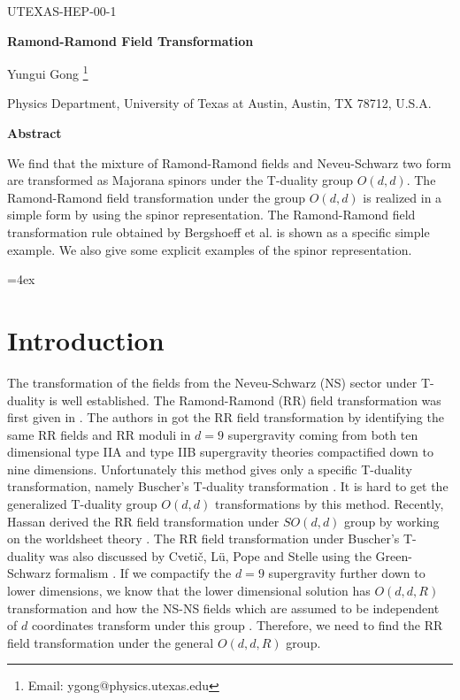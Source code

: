 \documentclass[a4paper,12pt]{article}
\begin{document}
\vspace *{2cm} 
\begin{flushright}
UTEXAS-HEP-00-1
\end{flushright}

\begin{center}
{\Large \bf Ramond-Ramond Field Transformation}

\bigskip

Yungui Gong \footnote{Email: ygong@physics.utexas.edu} 

Physics Department, University of Texas at Austin, Austin, TX 78712, U.S.A.
 
\bigskip
 
\vskip 0.8in
{\Large\bf Abstract}
\end{center}
We find that the mixture of Ramond-Ramond
fields and Neveu-Schwarz two form are transformed
as Majorana spinors under the T-duality group $O(d,d)$.
The Ramond-Ramond field transformation under
the group $O(d,d)$ is realized in a simple
form by using the spinor representation. The 
Ramond-Ramond field transformation rule obtained
by Bergshoeff et al. is shown as a specific simple example.
We also give some explicit examples of the spinor
representation.



\vskip 6cm

\pagebreak

\parindent=4ex 

\section{Introduction}

The transformation of the fields from the Neveu-Schwarz (NS) sector
under T-duality is well established. The Ramond-Ramond (RR) 
field transformation was first given in \cite{bergshoeff95}.
The authors in \cite{bergshoeff95} got the RR field transformation
by identifying the same RR fields and RR moduli 
in $d=9$ supergravity coming from both ten dimensional
type IIA and type IIB
supergravity theories compactified down to nine dimensions.
Unfortunately this method gives only a 
specific T-duality transformation,
namely Buscher's T-duality transformation
\cite{buscher87}. It is hard to
get the generalized T-duality group $O(d,d)$ transformations
by this method.  Recently, Hassan derived
the RR field transformation under $SO(d,d)$ group
by working on the worldsheet
theory \cite{hassan99}. The RR field transformation
under Buscher's T-duality was also discussed 
by Cveti\v c, L\"{u}, Pope and Stelle 
using the Green-Schwarz formalism \cite{cvetic99}. 
If we compactify the $d=9$ supergravity 
further down to lower dimensions, we know that the 
lower dimensional solution
has $O(d,d,R)$ transformation and how the NS-NS fields
which are assumed to be independent of $d$ coordinates
transform
under this group \cite{sen91}. Therefore, we need to 
find the RR
field transformation under the general $O(d,d,R)$ group.
\end{document}
